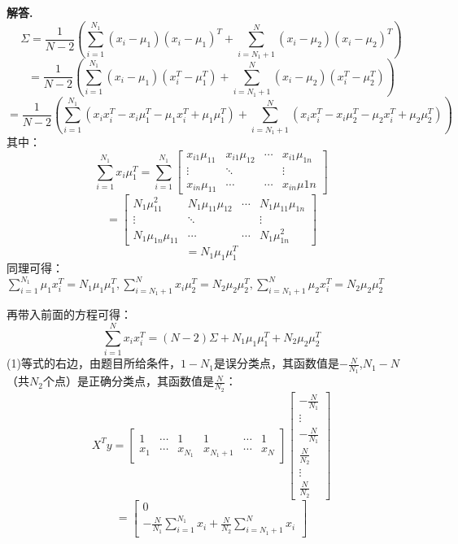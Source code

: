 \documentclass[12pt, a4paper, oneside]{ctexart}
\newenvironment{solution}{\par\noindent\textbf{解答. }}{\par}
\begin{document}
\begin{solution}
$$\Sigma = \frac{1}{N-2}(\sum_{i=1}^{N_1}(x_i-\mu_1)(x_i-\mu_1)^T +  \sum_{i=N_1+1}^{N}(x_i-\mu_2)(x_i-\mu_2)^T)$$
$$ = \frac{1}{N-2}(\sum_{i=1}^{N_1}(x_i-\mu_1)(x_i^T-\mu_1^T) +  \sum_{i=N_1+1}^{N}(x_i-\mu_2)(x_i^T-\mu_2^T))$$
$$ = \frac{1}{N-2}(\sum_{i=1}^{N_1}(x_i x_i^T-x_i\mu_1^T-\mu_1 x_i^T + \mu_1\mu_1^T) +  \sum_{i=N_1+1}^{N}(x_i x_i^T-x_i\mu_2^T-\mu_2 x_i^T + \mu_2\mu_2^T))$$
其中：
$$ \sum_{i=1}^{N_1} x_i\mu_1^T =  \sum_{i=1}^{N_1} \begin{bmatrix} x_{i1}\mu_{11} & x_{i1}\mu_{12} & \cdots & x_{i1}\mu_{1n} \\ \vdots & \ddots & & \vdots \\ x_{in}\mu_11 & \cdots & \cdots & x_{in}\mu{1n} \end{bmatrix}$$
$$ =  \begin{bmatrix} N_1 \mu_{11}^2 & N_1 \mu_{11}\mu_{12} & \cdots & N_1 \mu_{11}\mu_{1n} \\ \vdots & \ddots & & \vdots \\ N_1 \mu_{1n}\mu_11 & \cdots & \cdots & N_1 \mu_{1n}^2 \end{bmatrix} $$
$$ = N_1 \mu_1 \mu_1^T $$
同理可得：$ \sum_{i=1}^{N_1}\mu_1 x_i^T = N_1\mu_1\mu_1^T, \sum_{i=N_1+1}^{N}x_i\mu_2^T=N_2\mu_2\mu_2^T, \sum_{i=N_1+1}^{N}\mu_2 x_i^T = N_2\mu_2\mu_2^T$\par
再带入前面的方程可得：
$$\sum_{i=1}^{N} x_i x_i^T = (N-2)\Sigma+N_1\mu_1\mu_1^T+N_2\mu_2\mu_2^T$$
(1)等式的右边，由题目所给条件，$1-N_1$是误分类点，其函数值是$-\frac{N}{N_1}$,$N_1-N$（共$N_2$个点）是正确分类点，其函数值是$\frac{N}{N_2}$：
$$ X^T y = \begin{bmatrix}
               1 & \cdots & 1 & 1 & \cdots & 1 \\
               x_1 & \cdots & x_{N_1} & x_{N_1+1} & \cdots & x_N
\end{bmatrix} \begin{bmatrix}
               -\frac{N}{N_1} \\
               \vdots \\
               -\frac{N}{N_1} \\
               \frac{N}{N_2} \\
               \vdots \\
               \frac{N}{N_2}
\end{bmatrix}$$
$$ = \begin{bmatrix}
               0\\
               -\frac{N}{N_1}\sum_{i=1}^{N_1}x_i + \frac{N}{N_2}\sum_{i=N_1+1}^N x_i
\end{bmatrix}
$$
\end{solution}
\end{document}
